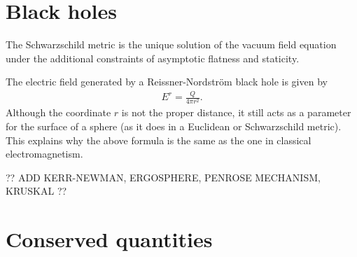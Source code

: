 \section{Black holes}


    \begin{theorem}[Birkhoff]
        The Schwarzschild metric is the unique solution of the vacuum field equation under the additional constraints of asymptotic flatness and staticity.
    \end{theorem}


    \begin{remark}
        The electric field generated by a Reissner-Nordstr\"om black hole is given by
        \begin{gather}
            E^r = \frac{Q}{4\pi r^2}.
        \end{gather}
        Although the coordinate $r$ is not the proper distance, it still acts as a parameter for the surface of a sphere (as it does in a Euclidean or Schwarzschild metric). This explains why the above formula is the same as the one in classical electromagnetism.
    \end{remark}

    ?? ADD KERR-NEWMAN, ERGOSPHERE, PENROSE MECHANISM, KRUSKAL ??

\section{Conserved quantities}

